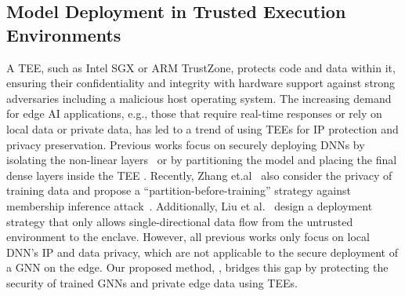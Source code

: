\subsection{Model Deployment in Trusted Execution Environments} \label{bg: deployment}
A TEE, such as Intel SGX or ARM TrustZone, protects code and data within it, ensuring their confidentiality and integrity with hardware support against strong adversaries including a malicious host operating system.
The increasing demand for edge AI applications, e.g., those that require real-time responses or rely on local data or private data, has led to a trend of using TEEs for IP protection and privacy preservation.
Previous works focus on securely deploying DNNs by isolating the non-linear layers~\cite{sun2023shadownet} or by partitioning the model and placing the final dense layers inside the TEE \cite{mo2020darknetz}.
Recently, Zhang et.al~\cite{zhang2024no} also consider the privacy of training data and propose a ``partition-before-training'' strategy against membership inference attack~\cite{shokri2017membership}. 
Additionally, Liu et al.~\cite{liu2023mirrornet} design a deployment strategy that only allows single-directional data flow from the untrusted environment to the enclave. 
However, all previous works only focus on local DNN's IP and data privacy, which are not applicable to the secure deployment of a GNN on the edge. 
Our proposed method, \mymethod, bridges this gap by protecting the security of trained GNNs and private edge data using TEEs.

